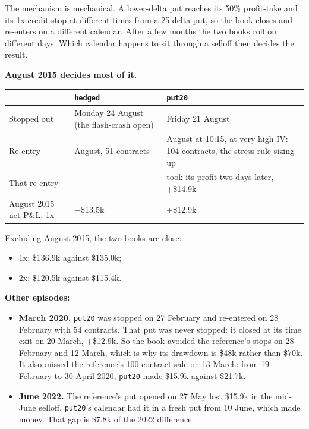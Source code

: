 \documentclass{article}
\begin{document}
The mechanism is mechanical. A lower-delta put reaches its 50\% profit-take and its 1x-credit stop at different times from a 25-delta put, so the book closes and re-enters on a different calendar. After a few months the two books roll on different days. Which calendar happens to sit through a selloff then decides the result.

\textbf{August 2015 decides most of it.}

\begin{center}\small
\begin{tabularx}{\linewidth}{>{\raggedright\arraybackslash}X >{\raggedright\arraybackslash}X >{\raggedright\arraybackslash}X}
\toprule
\textbf{} & \textbf{\texttt{hedged}} & \textbf{\texttt{put20}} \\
\midrule
Stopped out & Monday 24 August (the flash-crash open) & Friday 21 August \\
Re-entry & 25 August, 51 contracts & 24 August at 10:15, at very high IV: 104 contracts, the stress rule sizing up \\
That re-entry &  & took its profit two days later, +\$14.9k \\
August 2015 net P\&L, 1x & \ensuremath{-}\$13.5k & +\$12.9k \\
\bottomrule
\end{tabularx}
\end{center}

Excluding August 2015, the two books are close:

\begin{itemize}

\item 1x: \$136.9k against \$135.0k;

\item 2x: \$120.5k against \$115.4k.

\end{itemize}

\textbf{Other episodes:}

\begin{itemize}

\item \textbf{March 2020.} \texttt{put20} was stopped on 27 February and re-entered on 28 February with 54 contracts. That put was never stopped: it closed at its time exit on 20 March, +\$12.9k. So the book avoided the reference's stops on 28 February and 12 March, which is why its drawdown is \$48k rather than \$70k. It also missed the reference's 100-contract sale on 13 March: from 19 February to 30 April 2020, \texttt{put20} made \$15.9k against \$21.7k.

\item \textbf{June 2022.} The reference's put opened on 27 May lost \$15.9k in the mid-June selloff. \texttt{put20}'s calendar had it in a fresh put from 10 June, which made money. That gap is \$7.8k of the 2022 difference.

\end{itemize}
\end{document}
